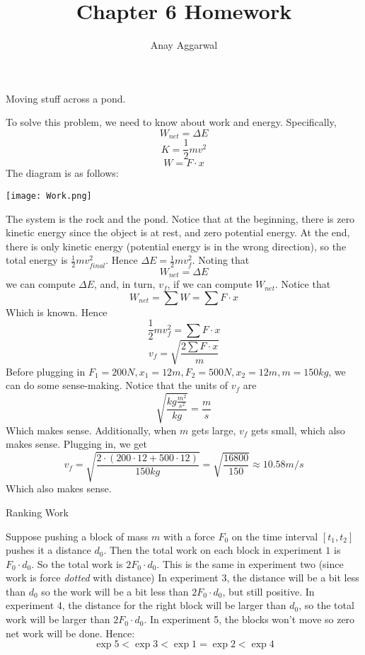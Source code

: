 \documentclass[11pt]{scrartcl}
\title{Chapter 6 Homework}
\author{Anay Aggarwal}
\begin{document}
\maketitle
\begin{example}
  Moving stuff across a pond.
\end{example}
\begin{soln}
  To solve this problem, we need to know about work and energy. Specifically,
  $$W_{net}=\Delta E$$
  $$K=\frac12 mv^2$$
  $$W=F\cdot x$$
  The diagram is as follows:
  \begin{center}\texttt{[image: Work.png]}\end{center}
  The system is the rock and the pond. Notice that at the beginning, there is zero kinetic energy since the object is at rest, and zero potential energy.
  At the end, there is only kinetic energy (potential energy is in the wrong direction), so the total energy is $\frac{1}{2}mv_{final}^2$. Hence $\Delta E=\frac{1}{2}mv_f^2$. Noting that
  $$W_{net}=\Delta E$$
  we can compute $\Delta E$, and, in turn, $v_f$, if we can compute $W_{net}$. Notice that
  $$W_{net}=\sum W=\sum F\cdot x$$
  Which is known. Hence
  $$\frac{1}{2}mv_f^2=\sum F\cdot x$$
  $$v_f=\sqrt{\frac{2\sum F\cdot x}{m}}$$
  Before plugging in $F_1=200N, x_1=12m, F_2=500N, x_2=12m, m=150kg$, we can do some sense-making. Notice that the units of $v_f$ are
  $$\sqrt{\frac{kg\frac{m^2}{s^2}}{kg}}=\frac{m}{s}$$
  Which makes sense. Additionally, when $m$ gets large, $v_f$ gets small, which also makes sense. Plugging in, we get
  $$v_f=\sqrt{\frac{2\cdot (200\cdot 12+500\cdot 12)}{150 kg}}=\sqrt{\frac{16800}{150}}\approx 10.58 m/s$$
  Which also makes sense.
\end{soln}
\begin{example}
  Ranking Work
\end{example}
\begin{soln}
  Suppose pushing a block of mass $m$ with a force $F_0$ on the time interval $[t_1,t_2]$
  pushes it a distance $d_0$. Then the total work on each block in experiment
  $1$ is $F_0\cdot d_0$. So the total work is $2F_0\cdot d_0$. This is the same in experiment two (since work is force \textit{dotted} with distance)
  In experiment 3, the distance will be a bit less than $d_0$ so the work will be a bit less than $2F_0\cdot d_0$, but still positive.
  In experiment 4, the distance for the right block will be larger than $d_0$, so the total work will be larger than $2F_0\cdot d_0$.
  In experiment 5, the blocks won't move so zero net work will be done. Hence:
  $$\exp 5<\exp 3<\exp 1=\exp 2<\exp 4$$
\end{soln}
\end{document}
